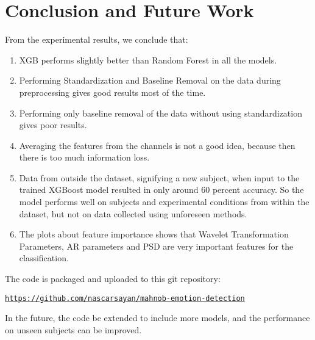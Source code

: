 
\chapter{Conclusion and Future Work} %

\label{Chapter8} %


From the experimental results, we conclude that:
\begin{enumerate}
    \item XGB performs slightly better than Random Forest in all the models.
    \item Performing Standardization and Baseline Removal on the data during preprocessing gives good results most of the time.
    \item Performing only baseline removal of the data without using standardization gives poor results.
    \item Averaging the features from the channels is not a good idea, because then there is too much information loss.
    \item Data from outside the dataset, signifying a new subject, when input to the trained XGBoost model resulted in only around 60 percent accuracy. So the model performs well on subjects and experimental conditions from within the dataset, but not on data collected using unforeseen methods.
    \item The plots about feature importance shows that Wavelet Transformation Parameters, AR parameters and PSD are very important features for the classification.
\end{enumerate}

The code is packaged and uploaded to this git repository:
\begin{center}
    \href{https://github.com/nascarsayan/mahnob-emotion-detection}{\texttt{https://github.com/nascarsayan/mahnob-emotion-detection}}
\end{center}
In the future, the code be extended to include more models, and the performance on unseen subjects can be improved.